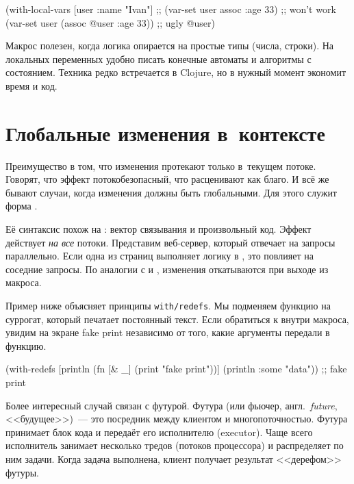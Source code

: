 \else

\begin{clojure}
(with-local-vars [user {:name "Ivan"}]
  ;; (var-set user assoc :age 33) ;; won't work
  (var-set user (assoc @user :age 33)) ;; ugly
  @user)
\end{clojure}

\fi

Макрос  полезен, когда логика опирается на простые типы
(числа, строки). На локальных переменных удобно писать конечные автоматы и
алгоритмы с состоянием. Техника редко встречается в Clojure, но в нужный момент
экономит время и код.

\section{Глобальные изменения в~контексте}


\label{with-redefs}

Преимущество  в том, что изменения протекают только в~текущем
потоке. Говорят, что эффект  потокобезопасный, что расценивают
как благо. И всё же бывают случаи, когда изменения должны быть глобальными. Для
этого служит форма .

Её синтаксис похож на : вектор связывания и произвольный
код. Эффект  действует \emph{на все} потоки. Представим
веб-сервер, который отвечает на запросы параллельно. Если одна из страниц
выполняет логику в , это повлияет на соседние
запросы. По аналогии с  и , изменения откатываются при
выходе из макроса.

Пример ниже объясняет принципы \texttt{with\-/redefs}. Мы подменяем функцию
 на суррогат, который печатает постоянный текст. Если обратиться к
 внутри макроса, увидим на экране fake print независимо от того,
какие аргументы передали в функцию.

\begin{clojure}
(with-redefs [println
              (fn [& _]
                (print "fake print\n"))]
  (println {:some "data"}))
;; fake print
\end{clojure}


Более интересный случай связан с футурой. Футура (или фьючер,
англ.~\emph{future}, <<будущее>>)~--- это посредник между клиентом и
многопоточностью. Футура принимает блок кода и передаёт его исполнителю
(executor). Чаще всего исполнитель занимает несколько тредов (потоков
процессора) и распределяет по ним задачи. Когда задача выполнена, клиент
получает результат <<дерефом>> футуры.

